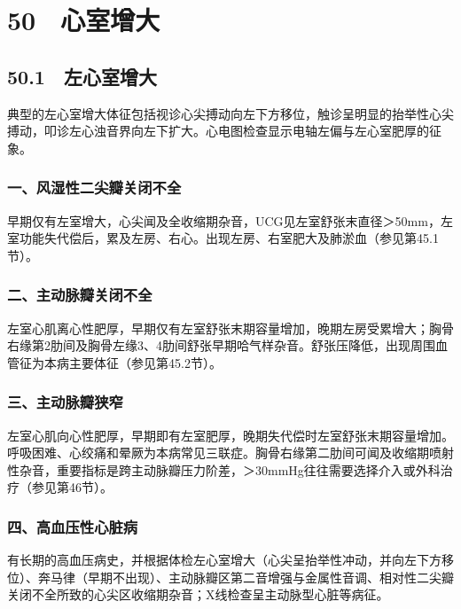 \protect\hypertarget{text00134.html}{}{}

\section{50　心室增大}

\subsection{50.1　左心室增大}

典型的左心室增大体征包括视诊心尖搏动向左下方移位，触诊呈明显的抬举性心尖搏动，叩诊左心浊音界向左下扩大。心电图检查显示电轴左偏与左心室肥厚的征象。

\subsubsection{一、风湿性二尖瓣关闭不全}

早期仅有左室增大，心尖闻及全收缩期杂音，UCG见左室舒张末直径＞50mm，左室功能失代偿后，累及左房、右心。出现左房、右室肥大及肺淤血（参见第45.1节）。

\subsubsection{二、主动脉瓣关闭不全}

左室心肌离心性肥厚，早期仅有左室舒张末期容量增加，晚期左房受累增大；胸骨右缘第2肋间及胸骨左缘3、4肋间舒张早期哈气样杂音。舒张压降低，出现周围血管征为本病主要体征（参见第45.2节）。

\subsubsection{三、主动脉瓣狭窄}

左室心肌向心性肥厚，早期即有左室肥厚，晚期失代偿时左室舒张末期容量增加。呼吸困难、心绞痛和晕厥为本病常见三联症。胸骨右缘第二肋间可闻及收缩期喷射性杂音，重要指标是跨主动脉瓣压力阶差，＞30mmHg往往需要选择介入或外科治疗（参见第46节）。

\subsubsection{四、高血压性心脏病}

有长期的高血压病史，并根据体检左心室增大（心尖呈抬举性冲动，并向左下方移位）、奔马律（早期不出现）、主动脉瓣区第二音增强与金属性音调、相对性二尖瓣关闭不全所致的心尖区收缩期杂音；X线检查呈主动脉型心脏等病征。

